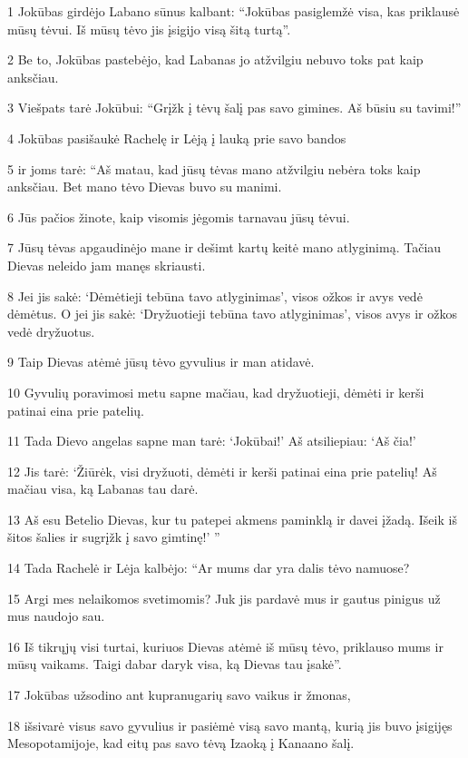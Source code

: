 \par 1 Jokūbas girdėjo Labano sūnus kalbant: “Jokūbas pasiglemžė visa, kas priklausė mūsų tėvui. Iš mūsų tėvo jis įsigijo visą šitą turtą”. 
\par 2 Be to, Jokūbas pastebėjo, kad Labanas jo atžvilgiu nebuvo toks pat kaip anksčiau. 
\par 3 Viešpats tarė Jokūbui: “Grįžk į tėvų šalį pas savo gimines. Aš būsiu su tavimi!” 
\par 4 Jokūbas pasišaukė Rachelę ir Lėją į lauką prie savo bandos 
\par 5 ir joms tarė: “Aš matau, kad jūsų tėvas mano atžvilgiu nebėra toks kaip anksčiau. Bet mano tėvo Dievas buvo su manimi. 
\par 6 Jūs pačios žinote, kaip visomis jėgomis tarnavau jūsų tėvui. 
\par 7 Jūsų tėvas apgaudinėjo mane ir dešimt kartų keitė mano atlyginimą. Tačiau Dievas neleido jam manęs skriausti. 
\par 8 Jei jis sakė: ‘Dėmėtieji tebūna tavo atlyginimas’, visos ožkos ir avys vedė dėmėtus. O jei jis sakė: ‘Dryžuotieji tebūna tavo atlyginimas’, visos avys ir ožkos vedė dryžuotus. 
\par 9 Taip Dievas atėmė jūsų tėvo gyvulius ir man atidavė. 
\par 10 Gyvulių poravimosi metu sapne mačiau, kad dryžuotieji, dėmėti ir kerši patinai eina prie patelių. 
\par 11 Tada Dievo angelas sapne man tarė: ‘Jokūbai!’ Aš atsiliepiau: ‘Aš čia!’ 
\par 12 Jis tarė: ‘Žiūrėk, visi dryžuoti, dėmėti ir kerši patinai eina prie patelių! Aš mačiau visa, ką Labanas tau darė. 
\par 13 Aš esu Betelio Dievas, kur tu patepei akmens paminklą ir davei įžadą. Išeik iš šitos šalies ir sugrįžk į savo gimtinę!’ ” 
\par 14 Tada Rachelė ir Lėja kalbėjo: “Ar mums dar yra dalis tėvo namuose? 
\par 15 Argi mes nelaikomos svetimomis? Juk jis pardavė mus ir gautus pinigus už mus naudojo sau. 
\par 16 Iš tikrųjų visi turtai, kuriuos Dievas atėmė iš mūsų tėvo, priklauso mums ir mūsų vaikams. Taigi dabar daryk visa, ką Dievas tau įsakė”. 
\par 17 Jokūbas užsodino ant kupranugarių savo vaikus ir žmonas, 
\par 18 išsivarė visus savo gyvulius ir pasiėmė visą savo mantą, kurią jis buvo įsigijęs Mesopotamijoje, kad eitų pas savo tėvą Izaoką į Kanaano šalį. 
